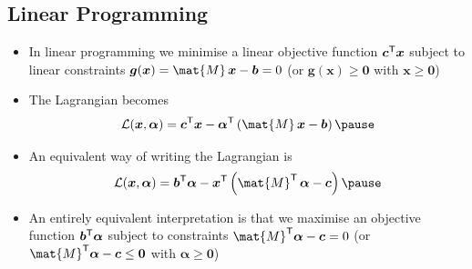 \begin{slide}
\section[-2]{Linear Programming}

\begin{PauseHighLight}
  \begin{itemize}
  \item In linear programming we minimise a linear objective function
    $\bm{c}^{\textsf{T}} \bm{x}$ subject to linear constraints $\bm{g}(\bm{x}) =
    \mat{M}\, \bm{x} - \bm{b} =0$ (or $\bm{g}(\bm{x})\geq\bm{0}$ with
    $\bm{x}\geq\bm{0}$)\pause
  \item The Lagrangian becomes
    \begin{align*}
      \mathcal{L}(\bm{x},\bm{\alpha}) = \bm{c}^\tr \bm{x} - \bm{\alpha}^\tr
      \left( \mat{M}\, \bm{x} - \bm{b} \right) \pause
    \end{align*}
  \item An equivalent way of writing the Lagrangian is
    \begin{align*}
      \mathcal{L}(\bm{x},\bm{\alpha}) 
      = \bm{b}^\tr\bm{\alpha} - \bm{x}^\tr\left( \mat{M}^\tr\, \bm{\alpha}
      - \bm{c}\right)\pause
    \end{align*}
  \item An entirely equivalent interpretation is that we maximise an
    objective function $\bm{b}^{\textsf{T}}\bm{\alpha}$ subject to constraints
    $\mat{M}^\tr \bm{\alpha} - \bm{c} = 0$ (or $\mat{M}^\tr
    \bm{\alpha} - \bm{c} \leq \bm{0}$ with $\bm{\alpha}\geq\bm{0}$)\pause
  \end{itemize}
\end{PauseHighLight}

\end{slide}



